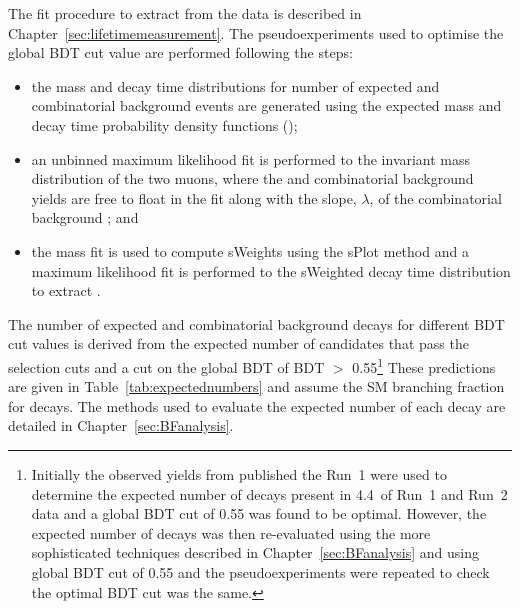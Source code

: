 The fit procedure to extract \tmumu from the data is described in Chapter~\ref{sec:lifetimemeasurement}. The pseudoexperiments used to optimise the global BDT cut value are performed following the steps:
\begin{itemize}
\item the mass and decay time distributions for number of expected \bsmumu and combinatorial background events are generated using the expected mass and decay time probability density functions (\pdfs);
\item an unbinned maximum likelihood fit is performed to the invariant mass distribution of the two muons, where the \bsmumu and combinatorial background yields are free to float in the fit along with the slope, $\lambda$, of the combinatorial background \pdf; and 
\item the mass fit is used to compute sWeights using the sPlot method \cite{Pivk:2004ty} and a maximum likelihood fit is performed to the sWeighted decay time distribution to extract \tmumu. 
\end{itemize}

The number of expected \bsmumu and combinatorial background decays for different BDT cut values is derived from the expected number of candidates that pass the \el selection cuts and a cut on the global BDT of BDT $>$ 0.55\footnote{Initially the observed yields from published the Run~1 \BFm were used to determine the expected number of decays present in 4.4~\fb of Run~1 and Run~2 data and a global BDT cut of 0.55 was found to be optimal. However, the expected number of decays was then re-evaluated using the more sophisticated techniques described in Chapter~\ref{sec:BFanalysis} and using global BDT cut of 0.55 and the pseudoexperiments were repeated to check the optimal BDT cut was the same.} %
These predictions are given in Table~\ref{tab:expectednumbers} and assume the SM branching fraction for \bsmumu decays. %
The methods used to evaluate the expected number of each decay are detailed in Chapter~\ref{sec:BFanalysis}. 

